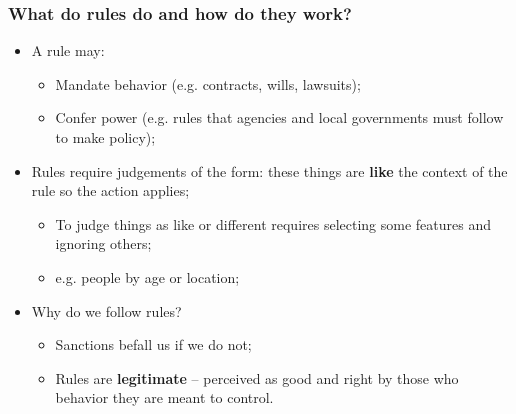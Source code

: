 \documentclass[aspectratio=169]{beamer}
\theoremstyle{principle}
\begin{document}
\begin{frame}
\frametitle{What do rules do and how do they work?}

\begin{itemize}
\item A rule may:
\begin{itemize}
\item Mandate behavior (e.g. contracts, wills, lawsuits);
\item Confer power (e.g. rules that agencies and local governments must follow to make policy);
\end{itemize}
\bigskip
\item Rules require judgements of the form: these things are \textbf{like} the context of the rule so the action applies;
\begin{itemize}
\item To judge things as like or different requires selecting some features and ignoring others;
\item e.g. people by age or location;
\end{itemize}
\bigskip
\item Why do we follow rules?
\begin{itemize}
\item Sanctions befall us if we do not;
\item Rules are \textbf{legitimate} -- perceived as good and right by those who behavior they are meant to control.
\end{itemize}

\end{itemize}

\end{frame}
\end{document}
